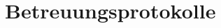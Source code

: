 \documentclass[paper=a4, 12pt]{scrreprt}
\begin{document}
%



%
\chapter{Betreuungsprotokolle}
\end{document}
